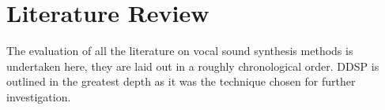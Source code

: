 \chapter{Literature Review}

\begin{center}
    \begin{minipage}{0.5\textwidth}
      \begin{small}
        The evaluation of all the literature on vocal sound synthesis methods is undertaken here, they are laid out in a roughly chronological order. DDSP is outlined in the greatest depth as it was the technique chosen for further investigation.
      \end{small}
    \end{minipage}
    \vspace{0.5cm}
  \end{center}







